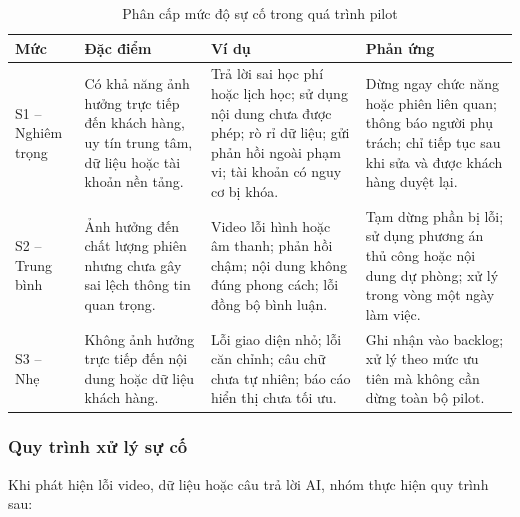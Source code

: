 \begin{table}[H]
    \centering
    \caption{Phân cấp mức độ sự cố trong quá trình pilot}
    \label{tab:incident-severity}
    \renewcommand{\arraystretch}{1.25}
    \begin{tabularx}{\textwidth}{
        p{}
        p{}
        X
        p{}
    }
        \hline
        \textbf{Mức}
        & \textbf{Đặc điểm}
        & \textbf{Ví dụ}
        & \textbf{Phản ứng} \\
        \hline

        S1 -- Nghiêm trọng
        &
        Có khả năng ảnh hưởng trực tiếp đến khách hàng, uy tín trung tâm, dữ liệu hoặc tài khoản nền tảng.
        &
        Trả lời sai học phí hoặc lịch học; sử dụng nội dung chưa được phép; rò rỉ dữ liệu; gửi phản hồi ngoài phạm vi; tài khoản có nguy cơ bị khóa.
        &
        Dừng ngay chức năng hoặc phiên liên quan; thông báo người phụ trách; chỉ tiếp tục sau khi sửa và được khách hàng duyệt lại. \\

        \hline

        S2 -- Trung bình
        &
        Ảnh hưởng đến chất lượng phiên nhưng chưa gây sai lệch thông tin quan trọng.
        &
        Video lỗi hình hoặc âm thanh; phản hồi chậm; nội dung không đúng phong cách; lỗi đồng bộ bình luận.
        &
        Tạm dừng phần bị lỗi; sử dụng phương án thủ công hoặc nội dung dự phòng; xử lý trong vòng một ngày làm việc. \\

        \hline

        S3 -- Nhẹ
        &
        Không ảnh hưởng trực tiếp đến nội dung hoặc dữ liệu khách hàng.
        &
        Lỗi giao diện nhỏ; lỗi căn chỉnh; câu chữ chưa tự nhiên; báo cáo hiển thị chưa tối ưu.
        &
        Ghi nhận vào backlog; xử lý theo mức ưu tiên mà không cần dừng toàn bộ pilot. \\

        \hline
    \end{tabularx}
\end{table}

\subsubsection{Quy trình xử lý sự cố}

Khi phát hiện lỗi video, dữ liệu hoặc câu trả lời AI, nhóm thực hiện quy trình sau:

